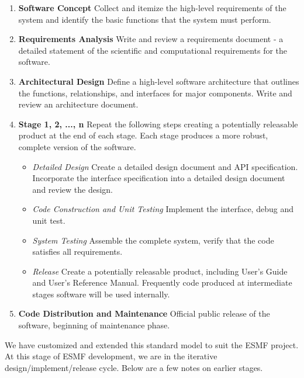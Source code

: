 \begin{enumerate}
\item {\bf Software Concept}  Collect and itemize the high-level requirements of the system and identify the basic functions that the system must perform.

\item {\bf Requirements Analysis} Write and review a requirements document - a detailed statement of the scientific and computational requirements for the software.

\item {\bf Architectural Design} Define a high-level software architecture that outlines the functions, relationships, and interfaces for major components. Write and review an architecture document.

\item {\bf Stage 1, 2, ..., n} Repeat the following steps creating a potentially releasable product at the end of each stage. Each stage produces a more robust, complete version of the software.

\begin{itemize}
\item {\it Detailed Design} Create a detailed design document and API specification. Incorporate the interface specification 
into a detailed design document and review the design.

\item {\it Code Construction and Unit Testing} Implement the interface, 
debug and unit test.

\item {\it System Testing}  Assemble the complete system, verify that the 
code satisfies all requirements.

\item {\it Release} Create a potentially releasable product, including User's Guide and User's Reference Manual. Frequently code produced at intermediate stages software will be used internally.
\end{itemize}

\item {\bf Code Distribution and Maintenance}  Official public release 
of the software, beginning of maintenance phase. 

\end{enumerate}

We have customized and extended this standard model to suit the ESMF project.
At this stage of ESMF development, we are in the iterative design/implement/release
cycle.  Below are a few notes on earlier stages.  

